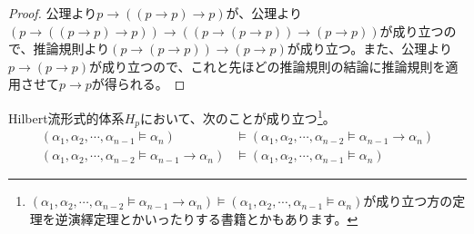 \documentclass[a4paper]{jsarticle}
\begin{document}
\begin{proof}
公理より$p \rightarrow \left( (p \rightarrow p) \rightarrow p \right)$が、公理より$\left( p \rightarrow \left( (p \rightarrow p) \rightarrow p \right) \right) \rightarrow \left( \left( p \rightarrow (p \rightarrow p) \right) \rightarrow (p \rightarrow p) \right)$が成り立つので、推論規則より$\left( p \rightarrow (p \rightarrow p) \right) \rightarrow (p \rightarrow p)$が成り立つ。また、公理より$p \rightarrow (p \rightarrow p)$が成り立つので、これと先ほどの推論規則の結論に推論規則を適用させて$p \rightarrow p$が得られる。
\end{proof}
\begin{thm}[演繹定理]
\label{1.1.1.2}
Hilbert流形式的体系$H_{p}$において、次のことが成り立つ\footnote{$\left( \alpha_{1},\alpha_{2},\cdots,\alpha_{n - 2} \vDash \alpha_{n - 1} \rightarrow \alpha_{n} \right) \vDash \left( \alpha_{1},\alpha_{2},\cdots,\alpha_{n - 1} \vDash \alpha_{n} \right)$が成り立つ方の定理を逆演繹定理とかいったりする書籍とかもあります。}。
\begin{align*}
\left( \alpha_{1},\alpha_{2},\cdots,\alpha_{n - 1} \vDash \alpha_{n} \right) &\vDash \left( \alpha_{1},\alpha_{2},\cdots,\alpha_{n - 2} \vDash \alpha_{n - 1} \rightarrow \alpha_{n} \right) \\
\left( \alpha_{1},\alpha_{2},\cdots,\alpha_{n - 2} \vDash \alpha_{n - 1} \rightarrow \alpha_{n} \right) &\vDash \left( \alpha_{1},\alpha_{2},\cdots,\alpha_{n - 1} \vDash \alpha_{n} \right)
\end{align*}
\end{thm}
\end{document}
